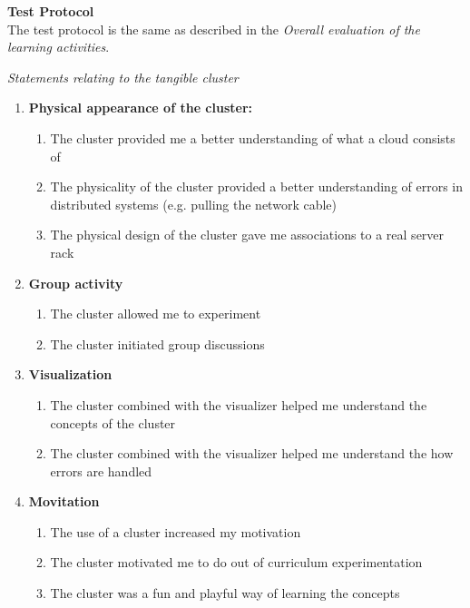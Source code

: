 \noindent\textbf{Test Protocol} \\
The test protocol is the same as described in the \textit{Overall evaluation of the learning activities}.

\noindent\textit{Statements relating to the tangible cluster}
\begin{enumerate}
	\item\textbf{Physical appearance of the cluster:}
	\vspace{-4mm}
	\begin{enumerate}
	    \setlength\itemsep{0.05em}
		\item The cluster provided me a better understanding of what a cloud consists of
		\item The physicality of the cluster provided a better understanding of errors in distributed systems (e.g. pulling the network cable)
		\item The physical design of the cluster gave me associations to a real server rack
	\end{enumerate}
	
	\item\textbf{Group activity}
	\vspace{-4mm}
	\begin{enumerate}
	    \setlength\itemsep{0.05em}
		\item The cluster allowed me to experiment
		\item The cluster initiated group discussions
	\end{enumerate}
	
	\item\textbf{Visualization}
	\vspace{-4mm}
	\begin{enumerate}
	    \setlength\itemsep{0.05em}
		\item The cluster combined with the visualizer helped me understand the concepts of the cluster
		\item The cluster combined with the visualizer helped me understand the how errors are handled
	\end{enumerate}
	
	\item\textbf{Movitation}
	\vspace{-4mm}
	\begin{enumerate}
	    \setlength\itemsep{0.05em}
		\item The use of a cluster increased my motivation
		\item The cluster motivated me to do out of curriculum experimentation
		\item The cluster was a fun and playful way of learning the concepts
	\end{enumerate}
	

\end{enumerate}
